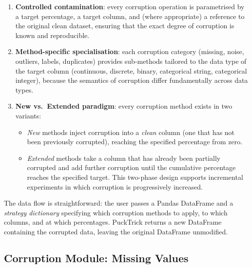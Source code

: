 \begin{enumerate}
    \item \textbf{Controlled contamination}: every corruption operation is
          parametrised by a target percentage, a target column, and (where
          appropriate) a reference to the original clean dataset, ensuring
          that the exact degree of corruption is known and reproducible.
    \item \textbf{Method-specific specialisation}: each corruption category
          (missing, noise, outliers, labels, duplicates) provides sub-methods
          tailored to the data type of the target column (continuous, discrete,
          binary, categorical string, categorical integer), because the
          semantics of corruption differ fundamentally across data types.
    \item \textbf{New vs.\ Extended paradigm}: every corruption method exists
          in two variants:
          \begin{itemize}
              \item \emph{New} methods inject corruption into a \emph{clean}
                    column (one that has not been previously corrupted), reaching
                    the specified percentage from zero.
              \item \emph{Extended} methods take a column that has already been
                    partially corrupted and add further corruption until the
                    cumulative percentage reaches the specified target.  This
                    two-phase design supports incremental experiments in which
                    corruption is progressively increased.
          \end{itemize}
\end{enumerate}

The data flow is straightforward: the user passes a Pandas DataFrame and a
\emph{strategy dictionary} specifying which corruption methods to apply, to
which columns, and at which percentages.  PuckTrick returns a new DataFrame
containing the corrupted data, leaving the original DataFrame unmodified.

\subsection{Corruption Module: Missing Values}
\label{sec:pucktrick-missing}

